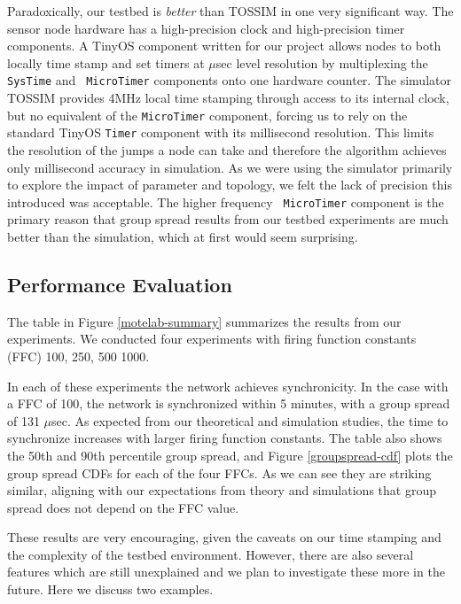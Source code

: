 \documentclass{sig-alternate}
\begin{document}
{Paradoxically, our testbed is {\em better} than TOSSIM in one very
significant way. The sensor node hardware has a high-precision clock
and high-precision timer components. A TinyOS component written for
our project allows nodes to both locally time stamp and set timers at
$\mu$sec level resolution by multiplexing the {\tt SysTime} and {\tt
MicroTimer} components onto one hardware counter. The simulator TOSSIM
provides 4MHz local time stamping through access to its internal
clock, but no equivalent of the {\tt MicroTimer} component, forcing us
to rely on the standard TinyOS {\tt Timer} component with its
millisecond resolution. This limits the resolution of the jumps a node
can take and therefore the algorithm achieves only millisecond
accuracy in simulation. As we were using the simulator primarily to
explore the impact of parameter and topology, we felt the lack of
precision this introduced was acceptable.  The higher frequency {\tt
MicroTimer} component is the primary reason that group spread results
from our testbed experiments are much better than the simulation,
which at first would seem surprising.

\subsection{Performance Evaluation} 

\label{performance-evaluation}


The table in Figure \ref{motelab-summary} summarizes the results from
our experiments. We conducted four experiments with firing function
constants (FFC) 100, 250, 500 1000.

In each of these experiments the network achieves synchronicity. In
the case with a FFC of 100, the network is synchronized within 5
minutes, with a group spread of 131 $\mu$sec. As expected from our
theoretical and simulation studies, the time to synchronize increases
with larger firing function constants. The table also shows the 50th
and 90th percentile group spread, and Figure \ref{groupspread-cdf}
plots the group spread CDFs for each of the four FFCs. As we can see
they are striking similar, aligning with our expectations from theory
and simulations that group spread does not depend on the FFC value.

These results are very encouraging, given the caveats on our time
stamping and the complexity of the testbed environment. However, there
are also several features which are still unexplained and we plan to
investigate these more in the future. Here we discuss two examples.

}
\end{document}
